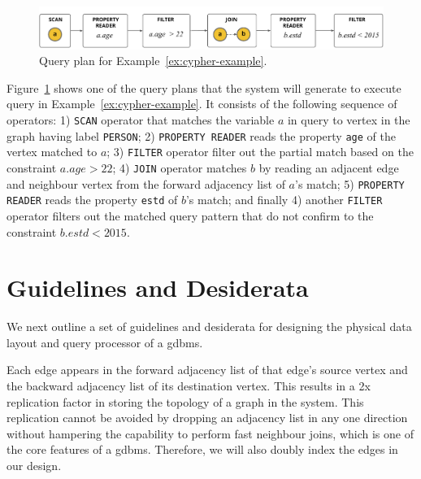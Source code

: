 \begin{figure}
	\hfill\includegraphics[scale=0.78]{img/ex-qp}\hfill
	\vspace{-10pt}
	\caption{Query plan for Example~\ref{ex:cypher-example}.}
	\vspace{-8pt}
	\label{fig:ex-qp}
\end{figure}

Figure~\ref{fig:ex-qp} shows one of the query plans that the system will generate to execute query in Example~\ref{ex:cypher-example}. It consists of the following sequence of operators: 1) \texttt{SCAN} operator that matches the variable $a$ in query to vertex in the graph having label \texttt{PERSON}; 2) \texttt{PROPERTY READER} reads the property \texttt{age} of the vertex matched to $a$; 3) \texttt{FILTER} operator filter out the partial match based on the constraint $a.age>22$; 4) \texttt{JOIN} operator matches $b$ by reading an adjacent edge and neighbour vertex from the forward adjacency list of $a$'s match; 5) \texttt{PROPERTY READER} reads the property \texttt{estd} of $b$'s match; and finally 4) another \texttt{FILTER} operator filters out the matched query pattern that do not confirm to the constraint $b.estd < 2015$.

\section{Guidelines and Desiderata}
\label{sec:guidelines}

We next outline a set of guidelines and desiderata for designing the physical data layout and query processor of a \gls{gdbms}.

\begin{guideline}
	\vspace{-5pt}
	Each edge appears in the forward adjacency list of that edge's source vertex and the backward adjacency list of its destination vertex. This results in a 2x replication factor in storing the topology of a graph in the system. This replication cannot be avoided by dropping an adjacency list in any one direction without hampering the capability to perform fast neighbour joins, which is one of the core features of a \gls{gdbms}. Therefore, we will also doubly index the edges in our design.
\end{guideline}


